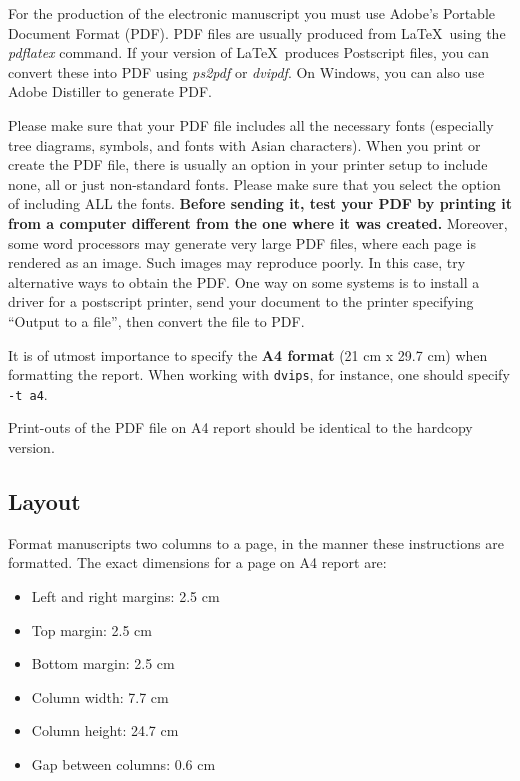\documentclass[11pt]{article}
\begin{document}
\label{sect:pdf}

For the production of the electronic manuscript you must use Adobe's
Portable Document Format (PDF). PDF files are usually produced from
\LaTeX\ using the \textit{pdflatex} command. If your version of
\LaTeX\ produces Postscript files, you can convert these into PDF
using \textit{ps2pdf} or \textit{dvipdf}. On Windows, you can also use
Adobe Distiller to generate PDF.

Please make sure that your PDF file includes all the necessary fonts
(especially tree diagrams, symbols, and fonts with Asian
characters). When you print or create the PDF file, there is usually
an option in your printer setup to include none, all or just
non-standard fonts.  Please make sure that you select the option of
including ALL the fonts. \textbf{Before sending it, test your PDF by
  printing it from a computer different from the one where it was
  created.} Moreover, some word processors may generate very large PDF
files, where each page is rendered as an image. Such images may
reproduce poorly. In this case, try alternative ways to obtain the
PDF. One way on some systems is to install a driver for a postscript
printer, send your document to the printer specifying ``Output to a
file'', then convert the file to PDF.

It is of utmost importance to specify the \textbf{A4 format} (21 cm
x 29.7 cm) when formatting the report. When working with
{\tt dvips}, for instance, one should specify {\tt -t a4}.

Print-outs of the PDF file on A4 report should be identical to the
hardcopy version.


\subsection{Layout}
\label{ssec:layout}

Format manuscripts two columns to a page, in the manner these
instructions are formatted. The exact dimensions for a page on A4
report are:

\begin{itemize}
\item Left and right margins: 2.5 cm
\item Top margin: 2.5 cm
\item Bottom margin: 2.5 cm
\item Column width: 7.7 cm
\item Column height: 24.7 cm
\item Gap between columns: 0.6 cm
\end{itemize}
\end{document}
